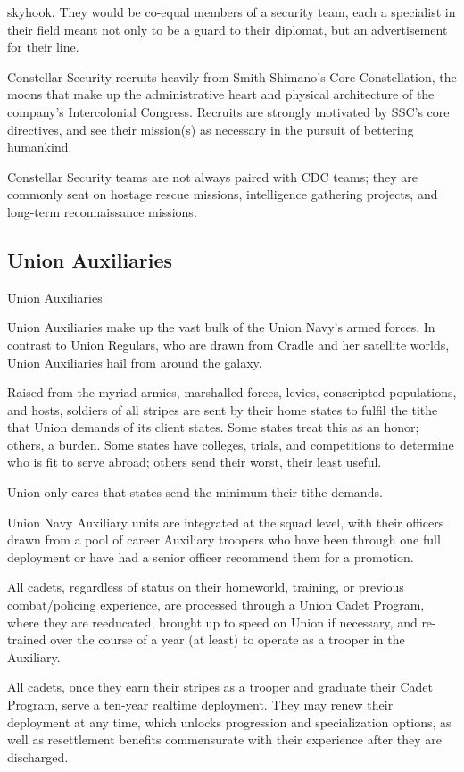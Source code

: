 skyhook. They would be co-equal members of a security team, each a specialist in their field
meant not only to be a guard to their diplomat, but an advertisement for their line.

Constellar Security recruits heavily from Smith-Shimano’s Core Constellation, the moons that
make up the administrative heart and physical architecture of the company’s Intercolonial
Congress. Recruits are strongly motivated by SSC’s core directives, and see their mission(s) as
necessary in the pursuit of bettering humankind.

Constellar Security teams are not always paired with CDC teams; they are commonly sent on
hostage rescue missions, intelligence gathering projects, and long-term reconnaissance missions.


\subsection{Union Auxiliaries}
Union Auxiliaries

Union Auxiliaries make up the vast bulk of the Union Navy’s armed forces. In contrast to Union
Regulars, who are drawn from Cradle and her satellite worlds, Union Auxiliaries hail from around
the galaxy.


Raised from the myriad armies, marshalled forces, levies, conscripted populations, and hosts,
soldiers of all stripes are sent by their home states to fulfil the tithe that Union demands of its
client states. Some states treat this as an honor; others, a burden. Some states have colleges,
trials, and competitions to determine who is fit to serve abroad; others send their worst, their
least useful.


Union only cares that states send the minimum their tithe demands.


Union Navy Auxiliary units are integrated at the squad level, with their officers drawn from a pool
of career Auxiliary troopers who have been through one full deployment or have had a senior
officer recommend them for a promotion.


All cadets, regardless of status on their homeworld, training, or previous combat/policing
experience, are processed through a Union Cadet Program, where they are reeducated, brought
up to speed on Union if necessary, and re-trained over the course of a year (at least) to operate
as a trooper in the Auxiliary.


All cadets, once they earn their stripes as a trooper and graduate their Cadet Program, serve a
ten-year realtime deployment. They may renew their deployment at any time, which unlocks
progression and specialization options, as well as resettlement benefits commensurate with their
experience after they are discharged.


